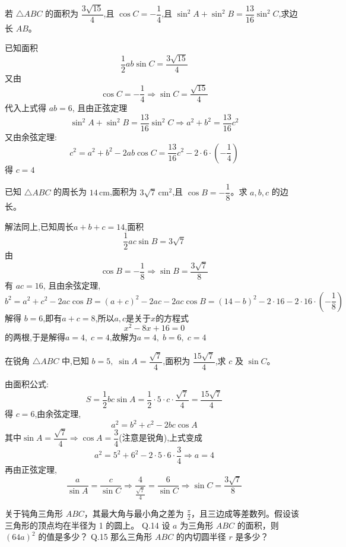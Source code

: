 \begin{questions}
    \question 若 \(\triangle ABC\) 的面积为 \(\dfrac{3\sqrt{15}}{4}\),且 \(\cos C = -\dfrac14\),且 \(\sin^2A + \sin^2B = \dfrac{13}{16}\sin^2C\),求边长 \(AB\)。  
    \begin{solution}
        已知面积
        \[
        \frac{1}{2} ab \sin C = \frac{3\sqrt{15}}{4}
        \]
        又由 \[
        \cos C = -\frac{1}{4} \Rightarrow \sin C = \frac{\sqrt{15}}{4}
        \]
        代入上式得 $ab = 6$, 且由正弦定理
        \[
        \sin^2 A + \sin^2 B = \frac{13}{16} \sin^2 C  \Rightarrow a^2 + b^2 = \frac{13}{16} c^2 
        \]
        又由余弦定理:
        \[
        c^2=a^2 + b^2-2ab\cos C =\frac{13}{16} c^2 -2 \cdot 6 \cdot \left(-\dfrac14\right) 
        \]
        得 $c=4$
    \end{solution}
    
    \question 已知 \(\triangle ABC\) 的周长为 \(14\,\text{cm}\),面积为 \(3\sqrt7\,\text{cm}^2\),且 \(\cos B = -\dfrac18\)。求 \(a,b,c\) 的边长。  
    \begin{solution}
        解法同上,已知周长\(a + b + c = 14\),面积
        \[
        \frac{1}{2} ac \sin B = 3\sqrt7
        \] 
        由\[
        \cos B =  -\dfrac18 \Rightarrow \sin B = \frac{3\sqrt{7}}{8}
        \]
        有 $ac=16$, 且由余弦定理, \[
        b^2=a^2+c^2-2ac \cos B =(a+c)^2-2ac-2ac \cos B =(14-b)^2-2\cdot 16-2\cdot 16 \cdot  \left(-\dfrac18\right)
        \]
        解得 $b=6$,即有$a+c=8$,所以$a,c$是关于$x$的方程式
        \[
        x^2-8x+16=0
        \]
        的两根,于是解得$a=4,\;c=4$,故解为$ a=4,\; b=6,\; c=4$
    \end{solution}
    
    \question 在锐角 \(\triangle ABC\) 中,已知 \(b=5,\; \sin A = \dfrac{\sqrt7}{4}\),面积为 \(\dfrac{15\sqrt7}{4}\),求 \(c\) 及 \(\sin C\)。  
    \begin{solution}
        由面积公式:
        \[
        S = \frac{1}{2}bc\sin A = \frac{1}{2} \cdot 5 \cdot c \cdot \frac{\sqrt{7}}{4} = \frac{15\sqrt{7}}{4}
        \]
        得 $c = 6$,由余弦定理,\[
            a^2=b^2+c^2-2bc \cos A
        \]
        其中$\sin A = \dfrac{\sqrt7}{4} \Rightarrow \cos A = \dfrac{3}{4}$(注意是锐角),上式变成\[
        a^2=5^2+6^2-2\cdot 5 \cdot 6 \cdot \dfrac{3}{4} \Rightarrow a=4
        \]再由正弦定理,\[
        \frac{a}{\sin A}= \frac{c}{\sin C} \Rightarrow \frac{4}{\frac{\sqrt7}{4}}= \frac{6}{\sin C} \Rightarrow \sin C=\dfrac{3\sqrt7}{8}
        \]
    \end{solution}
\question
关于钝角三角形 $ABC$，其最大角与最小角之差为 $\frac{\pi}{2}$，且三边成等差数列。假设该三角形的顶点均在半径为 1 的圆上。
Q.14 设 $a$ 为三角形 $ABC$ 的面积，则 $(64a)^2$ 的值是多少？
Q.15 那么三角形 $ABC$ 的内切圆半径 $r$ 是多少？


\end{questions}
